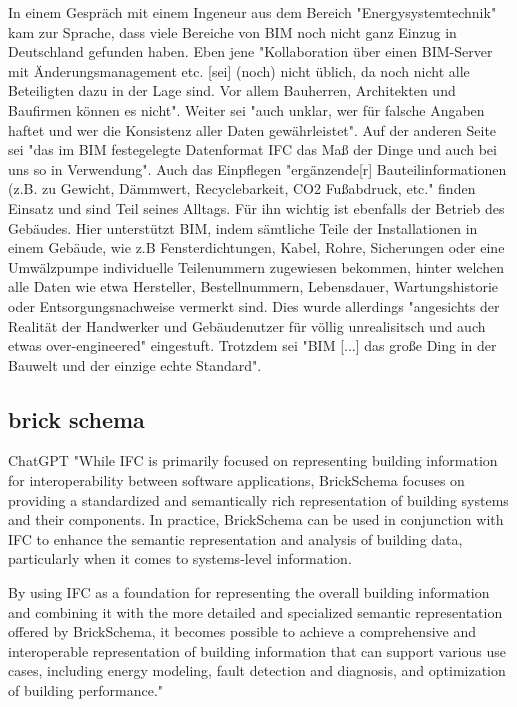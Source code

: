 In einem Gespräch mit einem Ingeneur aus dem Bereich "Energysystemtechnik" kam zur Sprache, dass viele Bereiche von BIM noch nicht ganz Einzug in Deutschland gefunden haben.
Eben jene "Kollaboration über einen BIM-Server mit Änderungsmanagement etc. [sei] (noch) nicht üblich, da noch nicht alle Beteiligten dazu in der Lage sind. Vor allem Bauherren, Architekten und Baufirmen können es nicht".
Weiter sei "auch unklar, wer für falsche Angaben haftet und wer die Konsistenz aller Daten gewährleistet".
Auf der anderen Seite sei "das im BIM festegelegte Datenformat IFC das Maß der Dinge und auch bei uns so in Verwendung".
Auch das Einpflegen "ergänzende[r] Bauteilinformationen (z.B. zu Gewicht, Dämmwert, Recyclebarkeit, CO2 Fußabdruck, etc." finden Einsatz und sind Teil seines Alltags.
Für ihn wichtig ist ebenfalls der Betrieb des Gebäudes.
Hier unterstützt BIM, indem sämtliche Teile der Installationen in einem Gebäude, wie z.B Fensterdichtungen, Kabel, Rohre, Sicherungen oder eine Umwälzpumpe individuelle Teilenummern zugewiesen bekommen, hinter welchen alle Daten wie etwa Hersteller, Bestellnummern, Lebensdauer, Wartungshistorie oder Entsorgungsnachweise vermerkt sind.
Dies wurde allerdings "angesichts der Realität der Handwerker und Gebäudenutzer für völlig unrealisitsch und auch etwas over-engineered" eingestuft.
Trotzdem sei "BIM [...] das große Ding in der Bauwelt und der einzige echte Standard".

\subsection{brick schema}
ChatGPT "While IFC is primarily focused on representing building information for interoperability between software applications, BrickSchema focuses on providing a standardized and semantically rich representation of building systems and their components. In practice, BrickSchema can be used in conjunction with IFC to enhance the semantic representation and analysis of building data, particularly when it comes to systems-level information.

By using IFC as a foundation for representing the overall building information and combining it with the more detailed and specialized semantic representation offered by BrickSchema, it becomes possible to achieve a comprehensive and interoperable representation of building information that can support various use cases, including energy modeling, fault detection and diagnosis, and optimization of building performance."

